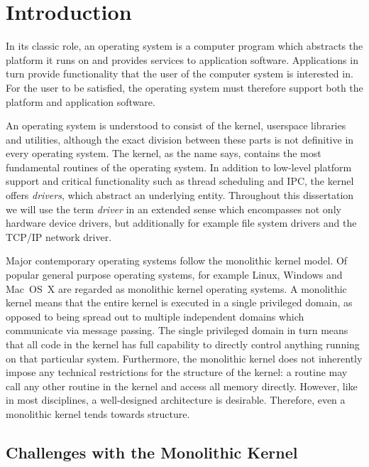 
\section{Introduction}
\label{chap:introduction}

In its classic role, an operating system is a computer program
which abstracts the platform it runs on and provides services to
application software.  Applications in turn provide functionality that
the user of the computer system is interested in.  For the user to be
satisfied, the operating system must therefore support both the platform
and application software.

An operating system is understood to consist of the kernel, userspace
libraries and utilities, although the exact division between these
parts is not definitive in every operating system.  The kernel, as the
name says, contains the most fundamental routines of the operating
system.  In addition to low-level platform support and critical
functionality such as thread scheduling and IPC, the kernel offers
\textit{drivers}, which abstract an underlying entity.  Throughout this
dissertation we will use the term \textit{driver} in an extended sense
which encompasses not only hardware device drivers, but additionally
for example file system drivers and the TCP/IP network driver.

Major contemporary operating systems follow the monolithic kernel model.
Of popular general purpose operating systems, for example Linux, Windows
and Mac~OS~X are regarded as monolithic kernel operating systems.
A monolithic kernel means that the entire kernel is executed in a single
privileged domain, as opposed to being spread out to multiple independent
domains which communicate via message passing.  The single privileged
domain in turn means that all code in the kernel has full capability to
directly control anything running on that particular system.  Furthermore,
the monolithic kernel does not inherently impose any technical
restrictions for the structure of the kernel: a routine may call any other
routine in the kernel and access all memory directly.  However, like
in most disciplines, a well-designed architecture is desirable.
Therefore, even a monolithic kernel tends towards structure.

\subsection{Challenges with the Monolithic Kernel}
\label{sect:challenge}

